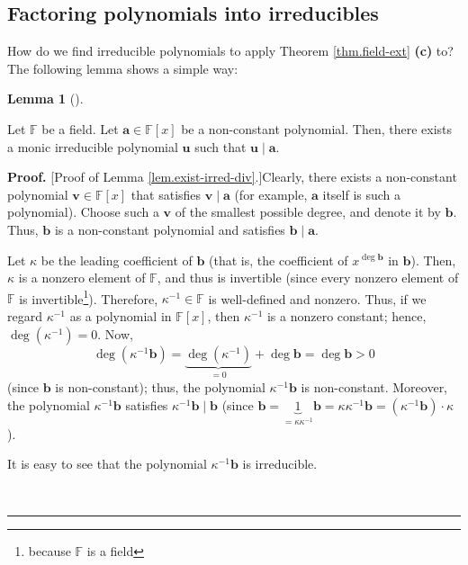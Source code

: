 \documentclass[numbers=enddot,12pt,final,onecolumn,notitlepage]{scrartcl}%
\theoremstyle{definition}
\newtheorem{lem}[theo]{Lemma}
\newenvironment{lemma}[1][]
{\begin{lem}[#1]\begin{leftbar}}
{\end{leftbar}\end{lem}}
\newenvironment{proof}[1][Proof]{\noindent\textbf{#1.} }{\ \rule{0.5em}{0.5em}}
\begin{document}
\subsection{Factoring polynomials into irreducibles}

How do we find irreducible polynomials to apply Theorem \ref{thm.field-ext}
\textbf{(c)} to? The following lemma shows a simple way:

\begin{lemma}
\label{lem.exist-irred-div}Let $\mathbb{F}$ be a field. Let $\mathbf{a}%
\in\mathbb{F}\left[  x\right]  $ be a non-constant polynomial. Then, there
exists a monic irreducible polynomial $\mathbf{u}$ such that $\mathbf{u}%
\mid\mathbf{a}$.
\end{lemma}

\begin{proof}
[Proof of Lemma \ref{lem.exist-irred-div}.]Clearly, there exists a
non-constant polynomial $\mathbf{v}\in\mathbb{F}\left[  x\right]  $ that
satisfies $\mathbf{v}\mid\mathbf{a}$ (for example, $\mathbf{a}$ itself is such
a polynomial). Choose such a $\mathbf{v}$ of the smallest possible degree, and
denote it by $\mathbf{b}$. Thus, $\mathbf{b}$ is a non-constant polynomial and
satisfies $\mathbf{b}\mid\mathbf{a}$.

Let $\kappa$ be the leading coefficient of $\mathbf{b}$ (that is, the
coefficient of $x^{\deg\mathbf{b}}$ in $\mathbf{b}$). Then, $\kappa$ is a
nonzero element of $\mathbb{F}$, and thus is invertible (since every nonzero
element of $\mathbb{F}$ is invertible\footnote{because $\mathbb{F}$ is a
field}). Therefore, $\kappa^{-1}\in\mathbb{F}$ is well-defined and nonzero.
Thus, if we regard $\kappa^{-1}$ as a polynomial in $\mathbb{F}\left[
x\right]  $, then $\kappa^{-1}$ is a nonzero constant; hence, $\deg\left(
\kappa^{-1}\right)  =0$. Now,
\[
\deg\left(  \kappa^{-1}\mathbf{b}\right)  =\underbrace{\deg\left(  \kappa
^{-1}\right)  }_{=0}+\deg\mathbf{b}=\deg\mathbf{b}>0
\]
(since $\mathbf{b}$ is non-constant); thus, the polynomial $\kappa
^{-1}\mathbf{b}$ is non-constant. Moreover, the polynomial $\kappa
^{-1}\mathbf{b}$ satisfies $\kappa^{-1}\mathbf{b}\mid\mathbf{b}$ (since
$\mathbf{b}=\underbrace{1}_{=\kappa\kappa^{-1}}\mathbf{b}=\kappa\kappa
^{-1}\mathbf{b}=\left(  \kappa^{-1}\mathbf{b}\right)  \cdot\kappa$).

It is easy to see that the polynomial $\kappa^{-1}\mathbf{b}$ is irreducible.


\end{proof}
\end{document}
